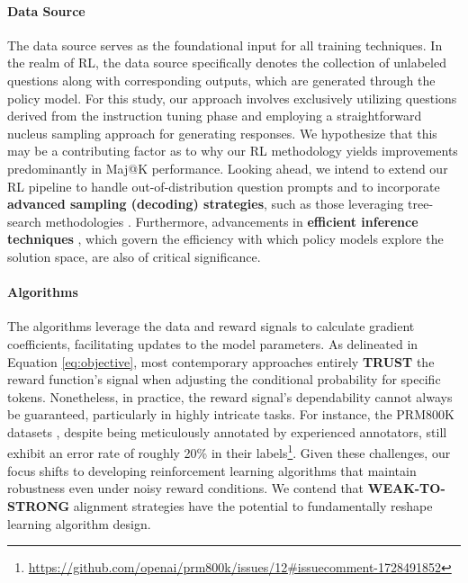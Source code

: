 \begin{itemize}[topsep=0pt]
\begin{itemize}[topsep=0pt]
\paragraph{Data Source} The data source serves as the foundational input for all training techniques. In the realm of RL, the data source specifically denotes the collection of unlabeled questions along with corresponding outputs, which are generated through the policy model. For this study, our approach involves exclusively utilizing questions derived from the instruction tuning phase and employing a straightforward nucleus sampling approach for generating responses. We hypothesize that this may be a contributing factor as to why our RL methodology yields improvements predominantly in Maj@K performance. Looking ahead, we intend to extend our RL pipeline to handle out-of-distribution question prompts and to incorporate \textbf{advanced sampling (decoding) strategies}, such as those leveraging tree-search methodologies \citep{yao2023tree}. Furthermore, advancements in \textbf{efficient inference techniques} \citep{xia-etal-2023-speculative,leviathan2023fast,kwon2023efficient,xia2024unlocking}, which govern the efficiency with which policy models explore the solution space, are also of critical significance.

\paragraph{Algorithms} The algorithms leverage the data and reward signals to calculate gradient coefficients, facilitating updates to the model parameters. As delineated in Equation \ref{eq:objective}, most contemporary approaches entirely \textbf{TRUST} the reward function’s signal when adjusting the conditional probability for specific tokens. Nonetheless, in practice, the reward signal’s dependability cannot always be guaranteed, particularly in highly intricate tasks. For instance, the PRM800K datasets \citep{lightman2023let}, despite being meticulously annotated by experienced annotators, still exhibit an error rate of roughly 20\% in their labels\footnote{\url{https://github.com/openai/prm800k/issues/12\#issuecomment-1728491852}}. Given these challenges, our focus shifts to developing reinforcement learning algorithms that maintain robustness even under noisy reward conditions. We contend that \textbf{WEAK-TO-STRONG} \citep{burns2023weak} alignment strategies have the potential to fundamentally reshape learning algorithm design.


\end{itemize}
\end{itemize}
